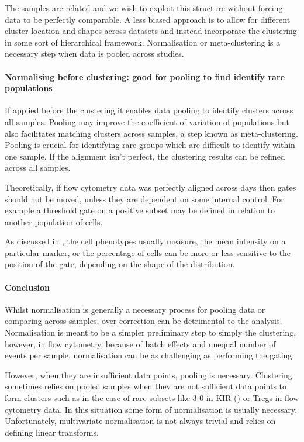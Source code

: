 The samples are related and we wish to exploit this structure without forcing data to be perfectly comparable.
A less biased approach is to allow for different cluster location and shapes across datasets and instead incorporate the clustering in some sort of hierarchical framework.  
Normalisation or meta-clustering is a necessary step when data is pooled across studies.


\paragraph{Normalising before clustering: good for pooling to find identify rare populations}

If applied before the clustering it enables data pooling to identify clusters across all samples.
Pooling may improve the coefficient of variation of populations but also facilitates
matching clusters across samples, a step known as meta-clustering.
Pooling is crucial for identifying rare groups which are difficult to identify within one sample.
If the alignment isn’t perfect, the clustering results can be refined across all samples.

Theoretically, if flow cytometry data was perfectly aligned across days then gates should not be moved, unless they are dependent on some internal control.  
For example a threshold gate on a positive subset may be defined in relation to
another population of cells.

As discussed in ,
the cell phenotypes usually measure, the mean intensity on a particular marker, or the percentage of cells can be more or less sensitive to the position of the gate,
depending on the shape of the distribution.


\paragraph{Conclusion}

Whilst normalisation is generally a necessary process for pooling data or comparing across samples, over correction can be detrimental to the analysis.
Normalisation is meant to be a simpler preliminary step to simply the clustering,
however, in flow cytometry, because of batch effects and unequal number of events per sample, normalisation can be as challenging as performing the gating.

However, when they are insufficient data points, pooling is necessary.
Clustering sometimes relies on pooled samples when they are not sufficient data points
to form clusters such as in the case of rare subsets like 3-0 in KIR () or Tregs in flow cytometry data.
In this situation some form of normalisation is usually necessary.
Unfortunately, multivariate normalisation is not always trivial and relies on defining linear transforms. 



